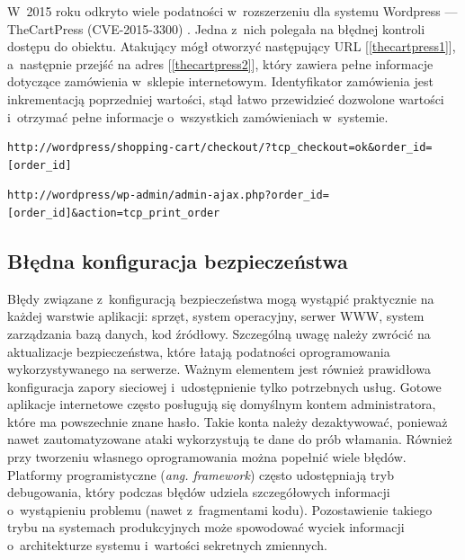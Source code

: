 \documentclass[12pt,a4paper,polish,thesis]{dcsbook}
\begin{document}
 W~2015 roku odkryto wiele podatności w~rozszerzeniu dla systemu Wordpress --- TheCartPress (CVE-2015-3300) \cite{thecartpress}. Jedna z~nich polegała na błędnej kontroli dostępu do obiektu. Atakujący mógł otworzyć następujący URL [\ref{thecartpress1}], a~następnie przejść na adres [\ref{thecartpress2}], który zawiera pełne informacje dotyczące zamówienia w~sklepie internetowym. Identyfikator zamówienia jest inkrementacją poprzedniej wartości, stąd łatwo przewidzieć dozwolone wartości i~otrzymać pełne informacje o~wszystkich zamówieniach w~systemie.
\pagebreak

\begin{lstlisting}[caption=adres URL zamówienia w~systemie TheCartPress,label=thecartpress1]
http://wordpress/shopping-cart/checkout/?tcp_checkout=ok&order_id=[order_id]
\end{lstlisting}

\begin{lstlisting}[caption=adres URL przeznaczony dla administratora do podglądu zamówienia,label=thecartpress2]
http://wordpress/wp-admin/admin-ajax.php?order_id=[order_id]&action=tcp_print_order
\end{lstlisting}


\subsection{Błędna konfiguracja bezpieczeństwa}
Błędy związane z~konfiguracją bezpieczeństwa mogą wystąpić praktycznie na każdej warstwie aplikacji: sprzęt, system operacyjny, serwer WWW, system zarządzania bazą danych, kod źródłowy. Szczególną uwagę należy zwrócić na aktualizacje bezpieczeństwa, które łatają podatności oprogramowania wykorzystywanego na serwerze. Ważnym elementem jest również prawidłowa konfiguracja zapory sieciowej i~udostępnienie tylko potrzebnych usług. Gotowe aplikacje internetowe często posługują się domyślnym kontem administratora, które ma powszechnie znane hasło. Takie konta należy dezaktywować, ponieważ nawet zautomatyzowane ataki wykorzystują te dane do prób włamania. Również przy tworzeniu własnego oprogramowania można popełnić wiele błędów. Platformy programistyczne (\textit{ang. framework}) często udostępniają tryb debugowania, który podczas błędów udziela szczegółowych informacji o~wystąpieniu problemu (nawet z~fragmentami kodu). Pozostawienie takiego trybu na systemach produkcyjnych może spowodować wyciek informacji o~architekturze systemu i~wartości sekretnych zmiennych.
\end{document}

